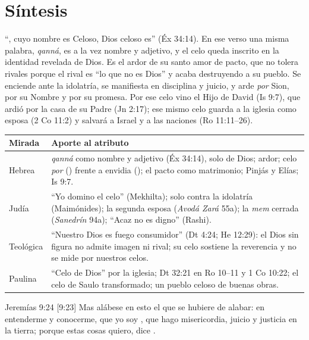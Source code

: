 \section{Síntesis}

``\SENOR, cuyo nombre es Celoso, Dios celoso es'' (Éx 34:14). En ese verso una misma palabra, \emph{qanná}, es a la vez nombre y adjetivo, y el celo queda inscrito en la identidad revelada de Dios. Es el ardor de su santo amor de pacto, que no tolera rivales porque el rival es ``lo que no es Dios'' y acaba destruyendo a su pueblo. Se enciende ante la idolatría, se manifiesta en disciplina y juicio, y arde \emph{por} Sion, por su Nombre y por su promesa. Por ese celo vino el Hijo de David (Is 9:7), que ardió por la casa de su Padre (Jn 2:17); ese mismo celo guarda a la iglesia como esposa (2 Co 11:2) y salvará a Israel y a las naciones (Ro 11:11--26).

\begin{center}\small\renewcommand{\arraystretch}{1.18}
\begin{tabular}{@{}L{2.4cm}L{11.4cm}@{}}
\toprule
\textbf{Mirada} & \textbf{Aporte al atributo} \\ \midrule
Hebrea & \emph{qanná} como nombre y adjetivo (Éx 34:14), solo de Dios; ardor; celo \emph{por} () frente a envidia (); el pacto como matrimonio; Pinjás y Elías; Is 9:7. \\
Judía & ``Yo domino el celo'' (Mekhilta); solo contra la idolatría (Maimónides); la segunda esposa (\emph{Avodá Zará} 55a); la \emph{mem} cerrada (\emph{Sanedrín} 94a); ``Acaz no es digno'' (Rashi). \\
Teológica & ``Nuestro Dios es fuego consumidor'' (Dt 4:24; He 12:29): el Dios sin figura no admite imagen ni rival; su celo sostiene la reverencia y no se mide por nuestros celos. \\
Paulina & ``Celo de Dios'' por la iglesia; Dt 32:21 en Ro 10--11 y 1 Co 10:22; el celo de Saulo transformado; un pueblo celoso de buenas obras. \\
\bottomrule
\end{tabular}\end{center}

\begin{verso}{Jeremías 9:24 [9:23]}
Mas alábese en esto el que se hubiere de alabar: en entenderme y conocerme, que yo soy \SENOR, que hago misericordia, juicio y justicia en la tierra; porque estas cosas quiero, dice \SENOR.
\end{verso}

